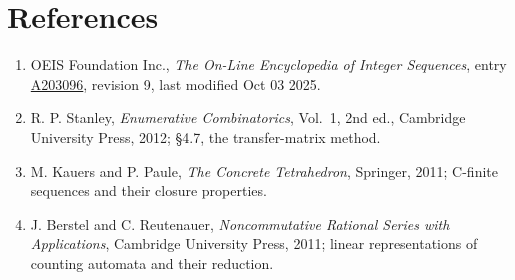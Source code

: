 \documentclass[11pt]{article}
\theoremstyle{definition}
\begin{document}
\section{References}

\begin{enumerate}

\item OEIS Foundation Inc., \emph{The On-Line Encyclopedia of Integer Sequences}, entry \href{https://oeis.org/A203096}{A203096}, revision 9, last modified Oct 03 2025.

\item R. P. Stanley, \emph{Enumerative Combinatorics}, Vol.~1, 2nd ed., Cambridge University Press, 2012; \S4.7, the transfer-matrix method.

\item M. Kauers and P. Paule, \emph{The Concrete Tetrahedron}, Springer, 2011; C-finite sequences and their closure properties.

\item J. Berstel and C. Reutenauer, \emph{Noncommutative Rational Series with Applications}, Cambridge University Press, 2011; linear representations of counting automata and their reduction.

\end{enumerate}
\end{document}
